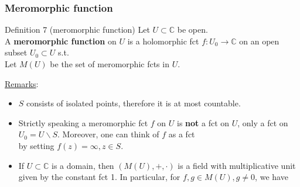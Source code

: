 \documentclass[10pt]{beamer}
\newcommand{\C}{\mathbb{C}}
\begin{document}
{\begin{frame}\frametitle{Meromorphic function}
\begin{alertblock}{Definition 7 (meromorphic function)}
Let $U \subset \C$ be open.\\
A \textbf{meromorphic function} on $U$ is a holomorphic fct $f: U_0 \rightarrow \C$ on an open subset $U_0 \subset U$ s.t.
$$\;$$
Let $M(U)$ be the set of meromorphic fcts in $U$.
\end{alertblock}
\vspace{0.1cm}
\underline{Remarks}:
\begin{itemize}
\item $S$ consists of isolated points, therefore it is at most countable.
\item Strictly speaking a meromorphic fct $f$ on $U$ is \textbf{not} a fct on $U$, only a fct on $U_0=U \backslash S$. Moreover, one can think of $f$ as a fct\\
\vspace{0.5cm}
by setting $f(z)=\infty, z \in S$.
\item If $U \subset \C$ is a domain, then $(M(U),+, \cdot)$ is a field with multiplicative unit given by the constant fct 1. In particular, for $f,g \in M(U), g \neq 0$, we have\\
\vspace{0.5cm}
\end{itemize}
\end{frame}


}
\end{document}
